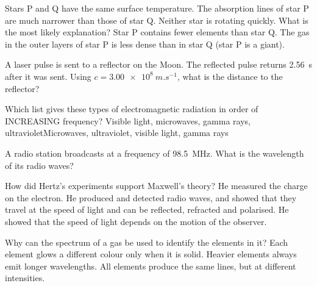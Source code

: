 \begin{quizq}{}
Stars P and Q have the same surface temperature. The absorption lines of star P are much narrower than
those of star Q. Neither star is rotating quickly. What is the most likely explanation?
  {Star P contains fewer elements than star Q.}
  {The gas in the outer layers of star P is less dense than in star Q (star P is a giant).}
\end{quizq}

\begin{quizq}{}
A laser pulse is sent to a reflector on the Moon. The reflected pulse returns \qty{2.56}{s} after it was
sent. Using $c = \qty{3.00e8}{m.s^{-1}}$, what is the distance to the reflector?
\end{quizq}

\begin{quizq}{}
Which list gives these types of electromagnetic radiation in order of INCREASING frequency?
  {Visible light, microwaves, gamma rays, ultraviolet}{Microwaves, ultraviolet, visible light, gamma rays}
\end{quizq}

\begin{quizq}{}
A radio station broadcasts at a frequency of \qty{98.5}{MHz}. What is the wavelength of its radio waves?
\end{quizq}

\begin{quizq}{}
How did Hertz's experiments support Maxwell's theory?
  {He measured the charge on the electron.}
  {He produced and detected radio waves, and showed that they travel at the speed of light and can be
   reflected, refracted and polarised.}
  {He showed that the speed of light depends on the motion of the observer.}
\end{quizq}

\begin{quizq}{}
Why can the spectrum of a gas be used to identify the elements in it?
  {Each element glows a different colour only when it is solid.}
  {Heavier elements always emit longer wavelengths.}
  {All elements produce the same lines, but at different intensities.}
\end{quizq}
